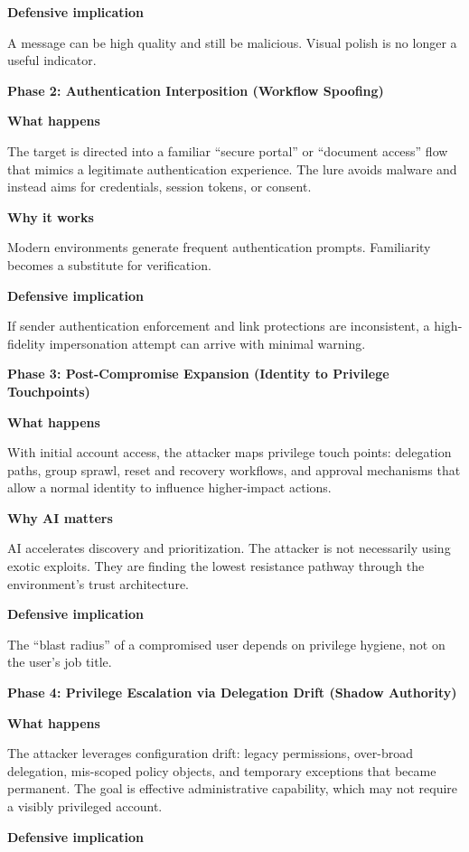 \documentclass[11pt]{article}
\begin{document}
\textbf{Defensive implication}

A message can be high quality and still be malicious. Visual polish is no longer a useful indicator.

\textbf{Phase 2: Authentication Interposition (Workflow Spoofing)}

\textbf{What happens}

The target is directed into a familiar ``secure portal'' or ``document access'' flow that mimics a legitimate authentication experience. The lure avoids malware and instead aims for credentials, session tokens, or consent.

\textbf{Why it works}

Modern environments generate frequent authentication prompts. Familiarity becomes a substitute for verification.

\textbf{Defensive implication}

If sender authentication enforcement and link protections are inconsistent, a high-fidelity impersonation attempt can arrive with minimal warning.

\textbf{Phase 3: Post-Compromise Expansion (Identity to Privilege Touchpoints)}

\textbf{What happens}

With initial account access, the attacker maps privilege touch points: delegation paths, group sprawl, reset and recovery workflows, and approval mechanisms that allow a normal identity to influence higher-impact actions.

\textbf{Why AI matters}

AI accelerates discovery and prioritization. The attacker is not necessarily using exotic exploits. They are finding the lowest resistance pathway through the environment’s trust architecture.

\textbf{Defensive implication}

The ``blast radius'' of a compromised user depends on privilege hygiene, not on the user’s job title.

\textbf{Phase 4: Privilege Escalation via Delegation Drift (Shadow Authority)}

\textbf{What happens}

The attacker leverages configuration drift: legacy permissions, over-broad delegation, mis-scoped policy objects, and temporary exceptions that became permanent. The goal is effective administrative capability, which may not require a visibly privileged account.

\textbf{Defensive implication}
\end{document}
